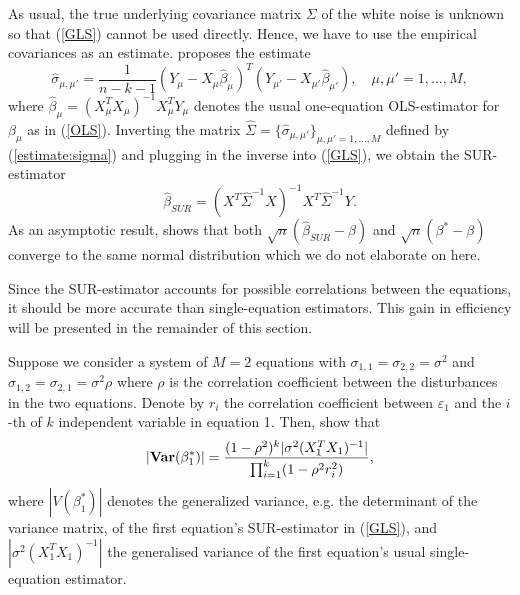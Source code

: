 \documentclass[a4paper, 12pt]{scrreprt}
\newcommand{\var}{\mbox{\textbf{Var}}}
\begin{document}
As usual, the true underlying covariance matrix $\Sigma$ of the white noise is unknown so that (\ref{GLS}) cannot be used directly. Hence, we have to use the empirical covariances as an estimate. \textcite[eq. (2.9)]{zellner1962efficient} proposes the estimate
\begin{equation}\label{estimate:sigma}
\hat{\sigma}_{\mu,\mu'} = \frac{1}{n - k -1} (Y_\mu - X_\mu \hat{\beta}_\mu)^T (Y_{\mu'} - X_{\mu'} \hat{\beta}_{\mu'}), \quad \mu,\mu' =1,\ldots,M,
\end{equation}
where $\hat{\beta}_\mu = (X_\mu^T X_\mu)^{-1} X_\mu^T Y_\mu$ denotes the usual one-equation OLS-estimator for $\beta_\mu$ as in (\ref{OLS}).
Inverting the matrix $\hat{\Sigma} = \{ \hat{\sigma}_{\mu,\mu'} \}_{\mu,\mu' = 1,\ldots, M}$  defined by (\ref{estimate:sigma}) and plugging in the inverse into (\ref{GLS}), we obtain the SUR-estimator 
\begin{equation}\label{SUR}
\hat{\beta}_{SUR} = (X^T \hat\Sigma^{-1} X)^{-1} X^T \hat\Sigma^{-1} Y.
\end{equation}
As an asymptotic result, \textcite[chapter 3.1]{zellner1962efficient} shows that both $\sqrt{n}(\hat{\beta}_{SUR} - \beta)$ and $\sqrt{n}(\beta^* - \beta)$ converge to the same normal distribution which we do not elaborate on here.

Since the SUR-estimator accounts for possible correlations between the equations, it should be more accurate than single-equation estimators. This gain in efficiency will be presented in the remainder of this section.

Suppose we consider a system of $M=2$ equations with $\sigma_{1,1} = \sigma_{2,2}= \sigma^2$ and \linebreak $\sigma_{1,2} = \sigma_{2,1} = \sigma^2 \rho$ where $\rho$ is the correlation coefficient between the disturbances in the two equations. Denote by $r_i$ the correlation coefficient between $\varepsilon_1$ and the $i$-th of $k$ independent variable in equation 1. Then, \textcite[eq. (3.28)]{zellner1962further} show that
\begin{equation}\label{SUR:efficiency}
| \var(\beta_1^*) | = \frac{(1-\rho^2)^k |\sigma^2 (X_1^T X_1)^{-1}|}{\prod_{i=1}^{k}(1-\rho^2 r_i^2)},
\end{equation}
where $| V(\beta_1^*) |$ denotes the generalized variance, e.g. the determinant of the variance matrix, of the first equation's SUR-estimator in (\ref{GLS}),
and $|\sigma^2 (X_1^T X_1)^{-1}|$ the generalised variance of the first equation's usual single-equation estimator.
\end{document}
